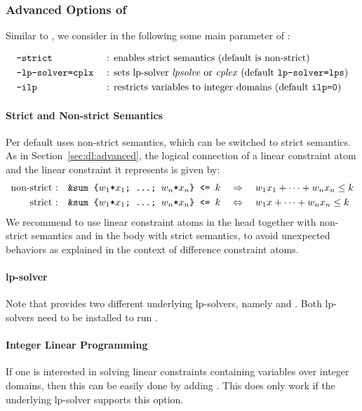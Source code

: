 \subsubsection{Advanced Options of }

Similar to , we consider in the following some main parameter of : 

\begin{align*}
 &\texttt{--strict} && \text{ : enables strict semantics (default is non-strict)}\\
 &\texttt{--lp-solver=cplx}&& \text{ : sets lp-solver \textit{lpsolve}{} or \textit{cplex}{} (default \texttt{lp-solver=lps})}\\
 &\texttt{--ilp}     && \text{ : restricts variables to integer domains (default \texttt{ilp=0})}  
\end{align*}

\paragraph{Strict and Non-strict Semantics}
Per default  uses non-strict semantics, which can be switched to strict semantics. 
%
As in Section~\ref{sec:dl:advanced}, the logical connection of a linear constraint atom and the linear constraint it represents is given by:
\begin{align*}
 \text{non-strict :}\quad&\texttt{\&sum\text{ }\{$w_1$*$x_1$;\text{ }\dots;\text{ }$w_n$*$x_n$\}\text{ }<=\text{ }$k$} \quad\Rightarrow\quad w_1x_1+\dots+w_nx_n\leq k\\
 \text{strict :}\quad&\texttt{\&sum\text{ }\{$w_1$*$x_1$;\text{ }\dots;\text{ }$w_n$*$x_n$\}\text{ }<=\text{ }$k$} \quad \Leftrightarrow \quad w_1x+\dots+w_nx_n\leq k
\end{align*}
We recommend to use linear constraint atoms in the head together with non-strict semantics and in the body with strict semantics, 
to avoid unexpected behaviors as explained in the context of difference constraint atoms. 

\paragraph{lp-solver} 
Note that  provides two different underlying lp-solvers, namely \lpsolve{} and \cplex{}. 
%
Both lp-solvers need to be installed to run . 

\paragraph{Integer Linear Programming} 
If one is interested in solving linear constraints containing variables over integer domains, 
then this can be easily done by adding . 
%
This does only work if the underlying lp-solver supports this option. 



